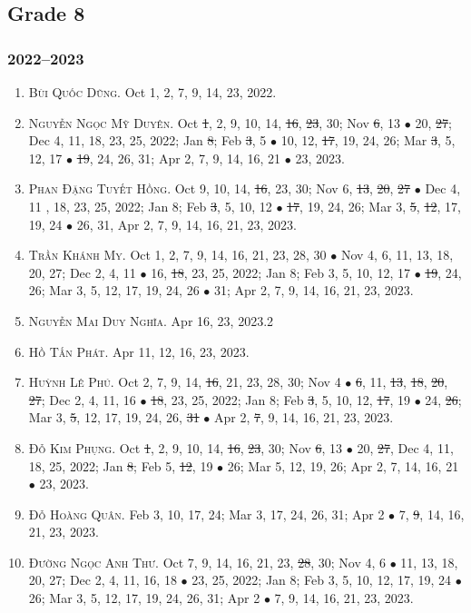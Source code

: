 \documentclass{article}
\begin{document}
\subsection{Grade 8}

\subsubsection{2022--2023}

\begin{enumerate}
	\item \textsc{Bùi Quốc Dũng.} {\sf[In]} Oct 1, 2, 7, 9, 14, 23, 2022. {\sf[Out]}
	\item \textsc{Nguyễn Ngọc Mỹ Duyên.} {\sf[In]} Oct \st{1}, 2, 9, 10, 14, \st{16}, \st{23}, 30; Nov \st{6}, 13 $\bullet$ 20, \st{27}; Dec 4, 11, 18, 23, 25, 2022; Jan \st{8}; Feb \st{3}, 5 $\bullet$ 10, 12, \st{17}, 19, 24, 26; Mar \st{3}, 5, 12, 17 $\bullet$ \st{19}, 24, 26, 31; Apr 2, 7, 9, 14, 16, 21 $\bullet$ 23, 2023.
	\item \textsc{Phan Đặng Tuyết Hồng.} {\sf[In]} Oct 9, 10, 14, \st{16}, 23, 30; Nov 6, \st{13}, \st{20}, \st{27} $\bullet$ Dec 4, 11 , 18, 23, 25, 2022; Jan 8; Feb \st{3}, 5, 10, 12 $\bullet$ \st{17}, 19, 24, 26; Mar 3, \st{5}, \st{12}, 17, 19, 24 $\bullet$ 26, 31, Apr 2, 7, 9, 14, 16, 21, 23, 2023.
	\item \textsc{Trần Khánh My.} {\sf[In]} Oct 1, 2, 7, 9, 14, 16, 21, 23, 28, 30 $\bullet$ Nov 4, 6, 11, 13, 18, 20, 27; Dec 2, 4, 11 $\bullet$ 16, \st{18}, 23, 25, 2022; Jan 8; Feb 3, 5, 10, 12, 17 $\bullet$ \st{19}, 24, 26; Mar 3, 5, 12, 17, 19, 24, 26 $\bullet$ 31; Apr 2, 7, 9, 14, 16, 21, 23, 2023.
	\item \textsc{Nguyễn Mai Duy Nghĩa.} {\sf[In]} Apr 16, 23, 2023.2
	\item \textsc{Hồ Tấn Phát.} {\sf[In]} Apr 11, 12, 16, 23, 2023.
	\item \textsc{Huỳnh Lê Phú.} {\sf[In]} Oct 2, 7, 9, 14, \st{16}, 21, 23, 28, 30; Nov 4 $\bullet$ \st{6}, 11, \st{13}, \st{18}, \st{20}, \st{27}; Dec 2, 4, 11, 16 $\bullet$ \st{18}, 23, 25, 2022; Jan 8; Feb \st{3}, 5, 10, 12, \st{17}, 19 $\bullet$ 24, \st{26}; Mar 3, \st{5}, 12, 17, 19, 24, 26, \st{31} $\bullet$ Apr 2, \st{7}, 9, 14, 16, 21, 23, 2023.
	\item \textsc{Đỗ Kim Phụng.} {\sf[In]} Oct \st{1}, 2, 9, 10, 14, \st{16}, \st{23}, 30; Nov \st{6}, 13 $\bullet$ 20, \st{27}, Dec 4, 11, 18, 25, 2022; Jan \st{8}; Feb 5, \st{12}, 19 $\bullet$ 26; Mar 5, 12, 19, 26; Apr 2, 7, 14, 16, 21 $\bullet$ 23, 2023.
	\item \textsc{Đỗ Hoàng Quân.} {\sf[In]} Feb 3, 10, 17, 24; Mar 3, 17, 24, 26, 31; Apr 2 $\bullet$ 7, \st{9}, 14, 16, 21, 23, 2023.
	\item \textsc{Đường Ngọc Anh Thư.} {\sf[In]} Oct 7, 9, 14, 16, 21, 23, \st{28}, 30; Nov 4, 6 $\bullet$ 11, 13, 18, 20, 27; Dec 2, 4, 11, 16, 18 $\bullet$ 23, 25, 2022; Jan 8; Feb 3, 5, 10, 12, 17, 19, 24 $\bullet$ 26; Mar 3, 5, 12, 17, 19, 24, 26, 31; Apr 2 $\bullet$ 7, 9, 14, 16, 21, 23, 2023.
\end{enumerate}
\end{document}

